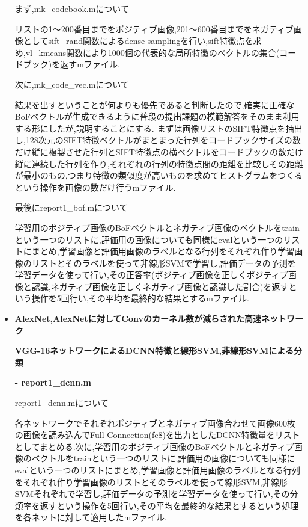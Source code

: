 \documentclass[11pt,a4j]{jreport}
\begin{document}
\begin{itemize}
  まず,mk\_codebook.mについて

  リストの1〜200番目までをポジティブ画像,201〜600番目までをネガティブ画像としてsift\_rand関数によるdense samplingを行い,sift特徴点を求め,vl\_kmeans関数により1000個の代表的な局所特徴のベクトルの集合(コードブック)を返すmファイル.

  次に,mk\_code\_vec.mについて

  結果を出すということが何よりも優先であると判断したので,確実に正確なBoFベクトルが生成できるように普段の提出課題の模範解答をそのまま利用する形にしたが,説明することにする.
  まずは画像リストのSIFT特徴点を抽出し,128次元のSIFT特徴ベクトルがまとまった行列をコードブックサイズの数だけ縦に複製させた行列とSIFT特徴点の横ベクトルをコードブックの数だけ縦に連続した行列を作り,それぞれの行列の特徴点間の距離を比較しその距離が最小のもの,つまり特徴の類似度が高いものを求めてヒストグラムをつくるという操作を画像の数だけ行うmファイル.


  最後にreport1\_bof.mについて

  学習用のポジティブ画像のBoFベクトルとネガティブ画像のベクトルをtrainという一つのリストに,評価用の画像についても同様にevalという一つのリストにまとめ,学習画像と評価用画像のラベルとなる行列をそれぞれ作り学習画像のリストとそのラベルを使って非線形SVMで学習し,評価データの予測を学習データを使って行い,その正答率(ポジティブ画像を正しくポジティブ画像と認識,ネガティブ画像を正しくネガティブ画像と認識した割合)を返すという操作を5回行い,その平均を最終的な結果とするmファイル.

\item \textbf{AlexNet,AlexNetに対してConvのカーネル数が減らされた高速ネットワーク}

      \textbf{VGG-16ネットワークによるDCNN特徴と線形SVM,非線形SVMによる分類}

      \hspace{0.5cm} \textbf{- report1\_dcnn.m}

      report1\_dcnn.mについて

      各ネットワークでそれぞれポジティブとネガティブ画像合わせて画像600枚の画像を読み込んでFull Connection(fc8)を出力としたDCNN特徴量をリストとしてまとめる.次に,学習用のポジティブ画像のBoFベクトルとネガティブ画像のベクトルをtrainという一つのリストに,評価用の画像についても同様にevalという一つのリストにまとめ,学習画像と評価用画像のラベルとなる行列をそれぞれ作り学習画像のリストとそのラベルを使って線形SVM,非線形SVMそれぞれで学習し,評価データの予測を学習データを使って行い,その分類率を返すという操作を5回行い,その平均を最終的な結果とするという処理を各ネットに対して適用したmファイル.


\end{itemize}
\end{document}
